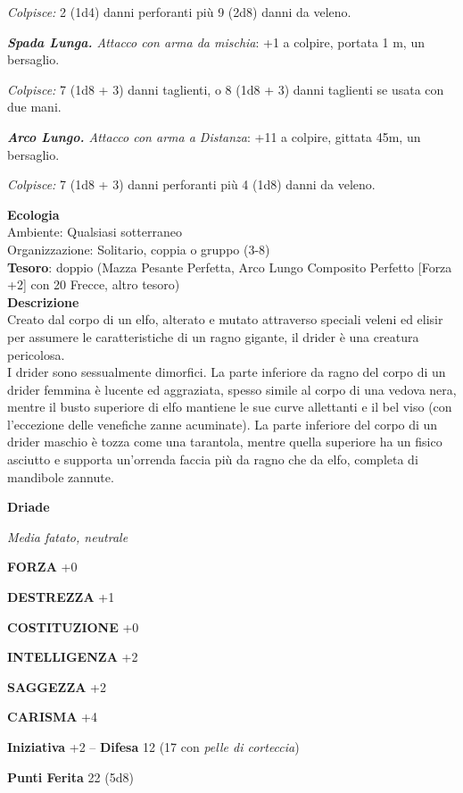 \begin{multicols}{2}
	\textit{Colpisce:} 2 (1d4) danni perforanti più 9 (2d8) danni da veleno.

	\textit{\textbf{Spada Lunga.} Attacco con arma da mischia}: +1 a colpire, portata 1 m, un bersaglio.

	\textit{Colpisce:} 7 (1d8 + 3) danni taglienti, o 8 (1d8 + 3) danni taglienti se usata con due mani.

	\textit{\textbf{Arco Lungo.} Attacco con arma a Distanza}: +11 a colpire, gittata 45m, un bersaglio.

	\textit{Colpisce:} 7 (1d8 + 3) danni perforanti più 4 (1d8) danni da veleno.

	\textbf{Ecologia}\\
	Ambiente: Qualsiasi sotterraneo\\
	Organizzazione: Solitario, coppia o gruppo (3-8)\\
	\textbf{Tesoro}: doppio (Mazza Pesante Perfetta, Arco Lungo Composito Perfetto [Forza +2] con 20 Frecce, altro tesoro)\\
	\textbf{Descrizione}\\
	Creato dal corpo di un elfo, alterato e mutato attraverso speciali veleni ed elisir per assumere le caratteristiche di un ragno gigante, il drider è una creatura pericolosa.\\
	I drider sono sessualmente dimorfici. La parte inferiore da ragno del corpo di un drider femmina è lucente ed aggraziata, spesso simile al corpo di una vedova nera, mentre il busto superiore di elfo mantiene le sue curve allettanti e il bel viso (con l'eccezione delle venefiche zanne acuminate). La parte inferiore del corpo di un drider maschio è tozza come una tarantola, mentre quella superiore ha un fisico asciutto e supporta un'orrenda faccia più da ragno che da elfo, completa di mandibole zannute.


	\medskip{}\textbf{Driade}

	\textit{Media fatato, neutrale}

	\textbf{FORZA} +0

	\textbf{DESTREZZA} +1

	\textbf{COSTITUZIONE} +0

	\textbf{INTELLIGENZA} +2

	\textbf{SAGGEZZA} +2

	\textbf{CARISMA} +4

	\textbf{Iniziativa} +2 -- \textbf{Difesa} 12 (17 con \textit{pelle di corteccia})

	\textbf{Punti Ferita} 22 (5d8)


\end{multicols}
